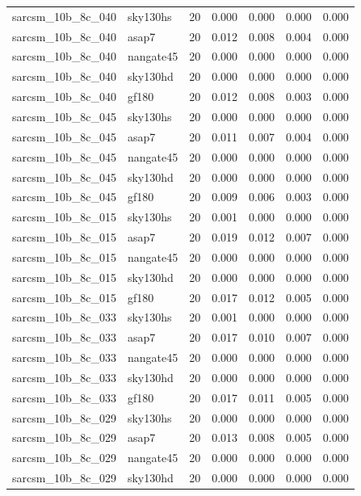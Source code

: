 \begin{tabular}{llrrrrr}
sarcsm\_10b\_8c\_040 & sky130hs & 20 & 0.000 & 0.000 & 0.000 & 0.000 \\
sarcsm\_10b\_8c\_040 & asap7 & 20 & 0.012 & 0.008 & 0.004 & 0.000 \\
sarcsm\_10b\_8c\_040 & nangate45 & 20 & 0.000 & 0.000 & 0.000 & 0.000 \\
sarcsm\_10b\_8c\_040 & sky130hd & 20 & 0.000 & 0.000 & 0.000 & 0.000 \\
sarcsm\_10b\_8c\_040 & gf180 & 20 & 0.012 & 0.008 & 0.003 & 0.000 \\
sarcsm\_10b\_8c\_045 & sky130hs & 20 & 0.000 & 0.000 & 0.000 & 0.000 \\
sarcsm\_10b\_8c\_045 & asap7 & 20 & 0.011 & 0.007 & 0.004 & 0.000 \\
sarcsm\_10b\_8c\_045 & nangate45 & 20 & 0.000 & 0.000 & 0.000 & 0.000 \\
sarcsm\_10b\_8c\_045 & sky130hd & 20 & 0.000 & 0.000 & 0.000 & 0.000 \\
sarcsm\_10b\_8c\_045 & gf180 & 20 & 0.009 & 0.006 & 0.003 & 0.000 \\
sarcsm\_10b\_8c\_015 & sky130hs & 20 & 0.001 & 0.000 & 0.000 & 0.000 \\
sarcsm\_10b\_8c\_015 & asap7 & 20 & 0.019 & 0.012 & 0.007 & 0.000 \\
sarcsm\_10b\_8c\_015 & nangate45 & 20 & 0.000 & 0.000 & 0.000 & 0.000 \\
sarcsm\_10b\_8c\_015 & sky130hd & 20 & 0.000 & 0.000 & 0.000 & 0.000 \\
sarcsm\_10b\_8c\_015 & gf180 & 20 & 0.017 & 0.012 & 0.005 & 0.000 \\
sarcsm\_10b\_8c\_033 & sky130hs & 20 & 0.001 & 0.000 & 0.000 & 0.000 \\
sarcsm\_10b\_8c\_033 & asap7 & 20 & 0.017 & 0.010 & 0.007 & 0.000 \\
sarcsm\_10b\_8c\_033 & nangate45 & 20 & 0.000 & 0.000 & 0.000 & 0.000 \\
sarcsm\_10b\_8c\_033 & sky130hd & 20 & 0.000 & 0.000 & 0.000 & 0.000 \\
sarcsm\_10b\_8c\_033 & gf180 & 20 & 0.017 & 0.011 & 0.005 & 0.000 \\
sarcsm\_10b\_8c\_029 & sky130hs & 20 & 0.000 & 0.000 & 0.000 & 0.000 \\
sarcsm\_10b\_8c\_029 & asap7 & 20 & 0.013 & 0.008 & 0.005 & 0.000 \\
sarcsm\_10b\_8c\_029 & nangate45 & 20 & 0.000 & 0.000 & 0.000 & 0.000 \\
sarcsm\_10b\_8c\_029 & sky130hd & 20 & 0.000 & 0.000 & 0.000 & 0.000 \\

\end{tabular}
